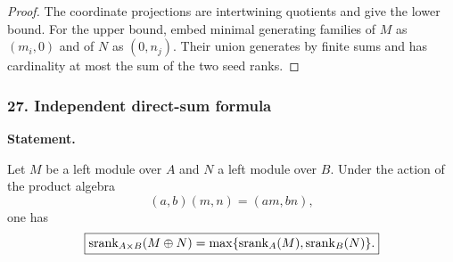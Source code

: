 \begin{proof}
The coordinate projections are intertwining quotients and give the lower bound.  For the upper bound, embed minimal generating families of $M$ as $(m_i,0)$ and of $N$ as $(0,n_j)$. Their union generates by finite sums and has cardinality at most the sum of the two seed ranks.
\end{proof}
\subsubsection*{27. Independent direct-sum formula}
\label{rec:PSC-I-T-INDEPENDENT-DIRECT-SUM}
\textbf{Statement.}\par
Let $M$ be a left module over $A$ and $N$ a left module over $B$.  Under the action of the product algebra
\[
(a,b)(m,n)=(am,bn),
\]
one has
\[
\boxed{
\operatorname{srank}_{A\times B}(M\oplus N)
=
\max\{\operatorname{srank}_A(M),\operatorname{srank}_B(N)\}.
}
\]

